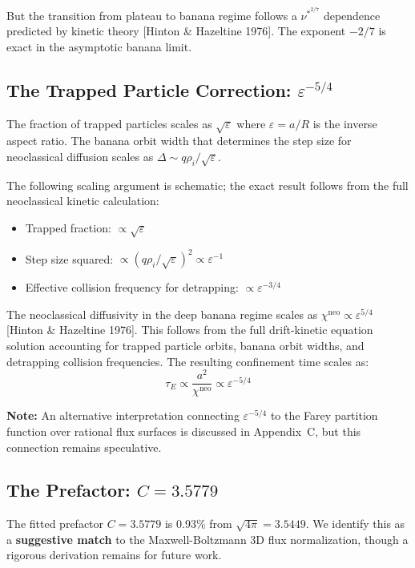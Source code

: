 \documentclass[11pt,letterpaper]{article}
\newcommand{\tauE}{\tau_E}
\newcommand{\nustar}{\nu^*}
\begin{document}
But the transition from plateau to banana regime follows a $\nustar^{2/7}$ dependence predicted by kinetic theory [Hinton \& Hazeltine 1976]. The exponent $-2/7$ is exact in the asymptotic banana limit.

\subsection{The Trapped Particle Correction: $\varepsilon^{-5/4}$}

The fraction of trapped particles scales as $\sqrt{\varepsilon}$ where $\varepsilon = a/R$ is the inverse aspect ratio. The banana orbit width that determines the step size for neoclassical diffusion scales as $\Delta \sim q\rho_i/\sqrt{\varepsilon}$.

The following scaling argument is schematic; the exact result follows from the full neoclassical kinetic calculation:
\begin{itemize}[noitemsep]
\item Trapped fraction: $\propto \sqrt{\varepsilon}$
\item Step size squared: $\propto (q\rho_i/\sqrt{\varepsilon})^2 \propto \varepsilon^{-1}$
\item Effective collision frequency for detrapping: $\propto \varepsilon^{-3/4}$
\end{itemize}

The neoclassical diffusivity in the deep banana regime scales as $\chi^{\text{neo}} \propto \varepsilon^{5/4}$ [Hinton \& Hazeltine 1976]. This follows from the full drift-kinetic equation solution accounting for trapped particle orbits, banana orbit widths, and detrapping collision frequencies. The resulting confinement time scales as:
\begin{equation}
\tauE \propto \frac{a^2}{\chi^{\text{neo}}} \propto \varepsilon^{-5/4}
\end{equation}

\textbf{Note:} An alternative interpretation connecting $\varepsilon^{-5/4}$ to the Farey partition function over rational flux surfaces is discussed in Appendix~C, but this connection remains speculative.

\subsection{The Prefactor: $C = 3.5779$}

The fitted prefactor $C = 3.5779$ is 0.93\% from $\sqrt{4\pi} = 3.5449$. We identify this as a \textbf{suggestive match} to the Maxwell-Boltzmann 3D flux normalization, though a rigorous derivation remains for future work.
\end{document}
